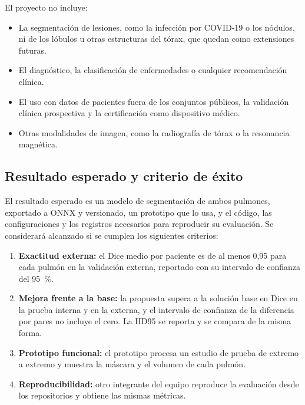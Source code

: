 \noindent El proyecto no incluye:

\begin{itemize}
    \item La segmentación de lesiones, como la infección por COVID-19 o los
          nódulos, ni de los lóbulos u otras estructuras del tórax, que quedan
          como extensiones futuras.
    \item El diagnóstico, la clasificación de enfermedades o cualquier
          recomendación clínica.
    \item El uso con datos de pacientes fuera de los conjuntos públicos, la
          validación clínica prospectiva y la certificación como dispositivo
          médico.
    \item Otras modalidades de imagen, como la radiografía de tórax o la
          resonancia magnética.
\end{itemize}

\subsection{Resultado esperado y criterio de éxito}\label{sec:expected-outcome}
El resultado esperado es un modelo de segmentación de ambos pulmones,
exportado a ONNX y versionado, un prototipo que lo usa, y el código, las
configuraciones y los registros necesarios para reproducir su evaluación. Se
considerará alcanzado si se cumplen los siguientes criterios:

\begin{enumerate}
    \item \textbf{Exactitud externa:} el Dice medio por paciente es de al
          menos 0,95 para cada pulmón en la validación externa, reportado con
          su intervalo de confianza del 95~\%.
    \item \textbf{Mejora frente a la base:} la propuesta supera a la solución
          base en Dice en la prueba interna y en la externa, y el intervalo de
          confianza de la diferencia por pares no incluye el cero. La HD95 se
          reporta y se compara de la misma forma.
    \item \textbf{Prototipo funcional:} el prototipo procesa un estudio de
          prueba de extremo a extremo y muestra la máscara y el volumen de cada
          pulmón.
    \item \textbf{Reproducibilidad:} otro integrante del equipo reproduce la
          evaluación desde los repositorios y obtiene las mismas métricas.
\end{enumerate}
